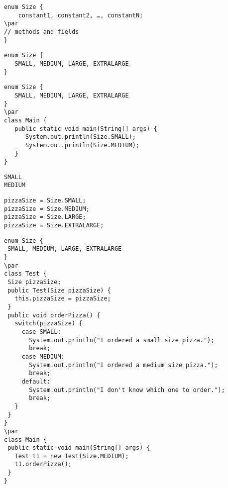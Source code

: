 \documentclass{book}
\def\lthtmlcheckvsize{\ifdim\ht\sizebox<\vsize 
  \ifdim\wd\sizebox<\hsize\expandafter\hfill\fi \expandafter\vfill
  \else\expandafter\vss\fi}%
\begin{document}
{\newpage\clearpage
{}%
\begin{lstlisting}
enum Size {
    constant1, constant2, …, constantN;
\par
// methods and fields	
}
\end{lstlisting}%
\lthtmlfigureZ
\lthtmlcheckvsize\clearpage}

{\newpage\clearpage
{}%
\begin{lstlisting}
enum Size { 
   SMALL, MEDIUM, LARGE, EXTRALARGE 
}
\end{lstlisting}%
\lthtmlfigureZ
\lthtmlcheckvsize\clearpage}

{\newpage\clearpage
{}%
\begin{lstlisting}
enum Size {
   SMALL, MEDIUM, LARGE, EXTRALARGE
}
\par
class Main {
   public static void main(String[] args) {
      System.out.println(Size.SMALL);
      System.out.println(Size.MEDIUM);
   }
}
\end{lstlisting}%
\lthtmlfigureZ
\lthtmlcheckvsize\clearpage}

{\newpage\clearpage
{}%
\begin{lstlisting}
SMALL
MEDIUM
\end{lstlisting}%
\lthtmlfigureZ
\lthtmlcheckvsize\clearpage}

{\newpage\clearpage
{}%
\begin{lstlisting}
pizzaSize = Size.SMALL;
pizzaSize = Size.MEDIUM;
pizzaSize = Size.LARGE;
pizzaSize = Size.EXTRALARGE;
\end{lstlisting}%
\lthtmlfigureZ
\lthtmlcheckvsize\clearpage}

{\newpage\clearpage
{}%
\begin{lstlisting}
enum Size {
 SMALL, MEDIUM, LARGE, EXTRALARGE
}
\par
class Test {
 Size pizzaSize;
 public Test(Size pizzaSize) {
   this.pizzaSize = pizzaSize;
 }
 public void orderPizza() {
   switch(pizzaSize) {
     case SMALL:
       System.out.println("I ordered a small size pizza.");
       break;
     case MEDIUM:
       System.out.println("I ordered a medium size pizza.");
       break;
     default:
       System.out.println("I don't know which one to order.");
       break;
   }
 }
}
\par
class Main {
 public static void main(String[] args) {
   Test t1 = new Test(Size.MEDIUM);
   t1.orderPizza();
 }
}
\end{lstlisting}%
\lthtmlfigureZ
\lthtmlcheckvsize\clearpage}
\end{document}
